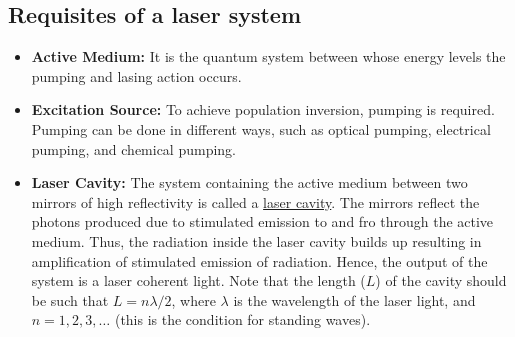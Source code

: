 \documentclass[12pt]{article}
\begin{document}
\subsection{Requisites of a laser system}
\begin{itemize}
    \item \textbf{Active Medium:} It is the quantum system between whose energy levels the pumping and lasing action occurs.
    \item \textbf{Excitation Source:} To achieve population inversion, pumping is required. Pumping can be done in different ways, such as optical pumping, electrical pumping, and chemical pumping.
    \item \textbf{Laser Cavity:} The system containing the active medium between two mirrors of high reflectivity is called a \underline{laser cavity}. The mirrors reflect the photons produced due to stimulated emission to and fro through the active medium. Thus, the radiation inside the laser cavity builds up resulting in amplification of stimulated emission of radiation. Hence, the output of the system is a laser coherent light. Note that the length (\(L\)) of the cavity should be such that \(L=n\lambda /2\), where \(\lambda\) is the wavelength of the laser light, and \(n=1,2,3,\ldots\) (this is the condition for standing waves).
\end{itemize}
\end{document}
